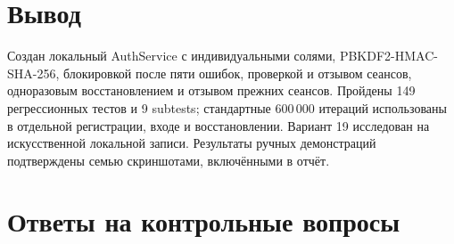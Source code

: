 \documentclass[12pt,a4paper]{article}
\begin{document}
\section{Вывод}
Создан локальный AuthService с индивидуальными солями, PBKDF2-HMAC-SHA-256, блокировкой после пяти ошибок, проверкой и отзывом сеансов, одноразовым восстановлением и отзывом прежних сеансов. Пройдены 149 регрессионных тестов и 9 subtests; стандартные 600\,000 итераций использованы в отдельной регистрации, входе и восстановлении. Вариант 19 исследован на искусственной локальной записи. Результаты ручных демонстраций подтверждены семью скриншотами, включёнными в отчёт.

\section{Ответы на контрольные вопросы}
\end{document}
